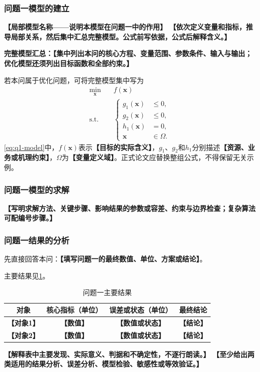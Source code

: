 \documentclass[UTF8,a4paper,12pt,zihao=-4]{ctexart}
\newcommand{\TemplateField}[1]{\textbf{【#1】}}
\begin{document}
\subsubsection{问题一模型的建立}
\noindent\TemplateField{局部模型名称——说明本模型在问题一中的作用}
\TemplateField{依次定义变量和指标，推导局部关系，然后集中汇总完整模型。公式前写依据，公式后解释含义。}

\noindent\textbf{完整模型汇总：}\TemplateField{集中列出本问的核心方程、变量范围、参数条件、输入与输出；优化模型还须列出目标函数和全部约束。}

若本问属于优化问题，可将完整模型集中写为
\begin{equation}
\label{eq:q1-model}
\begin{aligned}
\min_{\symbf{x}}\quad & f(\symbf{x}) \\
\mathrm{s.t.}\quad &
\left\{
\begin{aligned}
g_1(\symbf{x}) &\leq 0,\\
g_2(\symbf{x}) &\leq 0,\\
h_1(\symbf{x}) &= 0,\\
\symbf{x} &\in \Omega .
\end{aligned}
\right.
\end{aligned}
\end{equation}
\cref{eq:q1-model}中，$f(\symbf{x})$表示\TemplateField{目标的实际含义}，$g_1$、$g_2$和$h_1$分别描述\TemplateField{资源、业务或机理约束}，$\Omega$为\TemplateField{变量定义域}。正式论文应替换整组公式，不得保留无关示例。

\subsubsection{问题一模型的求解}
\TemplateField{写明求解方法、关键步骤、影响结果的参数或容差、约束与边界检查；复杂算法可配编号步骤。}

\subsubsection{问题一结果的分析}
先直接回答本问：\textbf{【填写问题一的最终数值、单位、方案或结论】}。

主要结果见\cref{tab:q1-results}。
\begin{table}[htbp]
  \centering
  \caption{问题一主要结果}
  \label{tab:q1-results}
  \begin{tabular}{cccc}
    \toprule[1.2pt]
    对象 & 核心指标（单位） & 误差或状态（单位） & 最终结论 \\
    \midrule[0.8pt]
    \TemplateField{对象1} & \TemplateField{数值} & \TemplateField{数值或状态} & \TemplateField{结论} \\
    \TemplateField{对象2} & \TemplateField{数值} & \TemplateField{数值或状态} & \TemplateField{结论} \\
    \bottomrule[1.2pt]
  \end{tabular}
\end{table}
\TemplateField{解释表中主要发现、实际意义、判据和不确定性，不逐行朗读。}
\TemplateField{至少给出两类适用的结果分析、误差分析、模型检验、敏感性或等效验证。}
\end{document}
